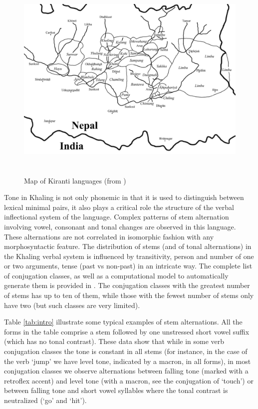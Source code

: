 \documentclass[oldfontcommands,oneside,a4paper,11pt]{article}
\begin{document}
\begin{figure}[h]
\centering
\includegraphics[height=100mm]{Kirant.jpeg}
\caption{Map of Kiranti languages (from \citealt{opgenort11tilung})}
\label{fig:kiranti}
\end{figure}


 Tone in Khaling is not only phonemic in that it is used to distinguish between lexical minimal pairs, it also plays a critical role  the structure of the verbal inflectional system of the language. Complex patterns of stem alternation involving vowel, consonant and tonal changes are observed in this language. These alternations are not correlated in isomorphic fashion with any morphosyntactic feature.  The distribution of stems (and of tonal alternations) in the Khaling verbal system is influenced by transitivity, person and number of one or two arguments, tense (past vs non-past) in an intricate way. The complete list of conjugation classes, as well as a computational model to automatically generate them is provided in \citet{jacques12khaling}. The conjugation classes with the greatest number of stems has up to ten of them, while those with the fewest number of stems only have two (but such classes are very limited).

Table \ref{tab:intro} illustrate some typical examples of stem alternations. All the forms in the table comprise a stem followed by one unstressed short vowel suffix (which has no tonal contrast). These data show that while in some verb conjugation classes the tone is constant in all stems (for instance, in the case of the verb `jump' we have level tone, indicated by a macron, in all forms), in most conjugation classes we observe alternations between falling tone (marked with a retroflex accent) and level tone (with a macron, see the conjugation of `touch') or between falling tone and short vowel syllables where the tonal contrast is neutralized (`go' and `hit'). 
\end{document}
